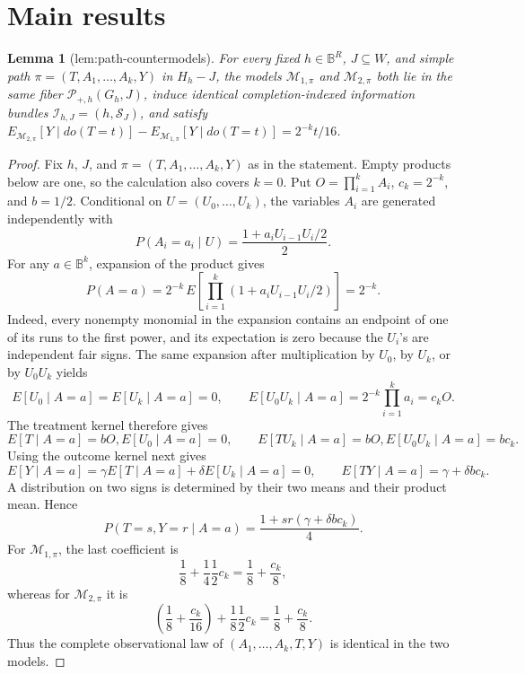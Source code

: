 \documentclass{article}
\newtheorem{lemma}{Lemma}
\begin{document}
\section{Main results}

\begin{lemma}[lem:path-countermodels]\label{lem:path-countermodels}
For every fixed \(h\in\mathbb B^R\), \(J\subseteq W\), and simple path \(\pi=(T,A_1,\ldots,A_k,Y)\) in \(H_h-J\), the models \(\mathcal M_{1,\pi}\) and \(\mathcal M_{2,\pi}\) both lie in the same fiber \(\mathcal P_{+,h}(G_h,J)\), induce identical completion-indexed information bundles \(\mathcal I_{h,J}=(h,\mathcal S_J)\), and satisfy \(E_{\mathcal M_{2,\pi}}[Y\mid do(T=t)]-E_{\mathcal M_{1,\pi}}[Y\mid do(T=t)]=2^{-k}t/16\).
\end{lemma}
\begin{proof}
Fix \(h\), \(J\), and \(\pi=(T,A_1,\ldots,A_k,Y)\) as in the statement.  Empty products below are one, so the calculation also covers \(k=0\).  Put \(O=\prod_{i=1}^k A_i\), \(c_k=2^{-k}\), and \(b=1/2\).  Conditional on \(U=(U_0,\ldots,U_k)\), the variables \(A_i\) are generated independently with
\[
 P(A_i=a_i\mid U)=\frac{1+a_iU_{i-1}U_i/2}{2}.
\]
For any \(a\in\mathbb B^k\), expansion of the product gives
\[
 P(A=a)=2^{-k}\,E\!\left[\prod_{i=1}^k(1+a_iU_{i-1}U_i/2)\right]=2^{-k}.
\]
Indeed, every nonempty monomial in the expansion contains an endpoint of one of its runs to the first power, and its expectation is zero because the \(U_i\)'s are independent fair signs.  The same expansion after multiplication by \(U_0\), by \(U_k\), or by \(U_0U_k\) yields
\[
 E[U_0\mid A=a]=E[U_k\mid A=a]=0,
 \qquad
 E[U_0U_k\mid A=a]=2^{-k}\prod_{i=1}^k a_i=c_kO.
\]
The treatment kernel therefore gives
\[
 E[T\mid A=a]=bO,E[U_0\mid A=a]=0,
 \qquad
 E[TU_k\mid A=a]=bO,E[U_0U_k\mid A=a]=bc_k.
\]
Using the outcome kernel next gives
\[
 E[Y\mid A=a]=\gamma E[T\mid A=a]+\delta E[U_k\mid A=a]=0,
 \qquad
 E[TY\mid A=a]=\gamma+\delta bc_k.
\]
A distribution on two signs is determined by their two means and their product mean.  Hence
\[
 P(T=s,Y=r\mid A=a)=\frac{1+sr(\gamma+\delta bc_k)}{4}.
\]
For \(\mathcal M_{1,\pi}\), the last coefficient is
\[
 \frac18+\frac14\frac12c_k=\frac18+\frac{c_k}{8},
\]
whereas for \(\mathcal M_{2,\pi}\) it is
\[
 \left(\frac18+\frac{c_k}{16}\right)+\frac18\frac12c_k
 =\frac18+\frac{c_k}{8}.
\]
Thus the complete observational law of \((A_1,\ldots,A_k,T,Y)\) is identical in the two models.


\end{proof}
\end{document}
